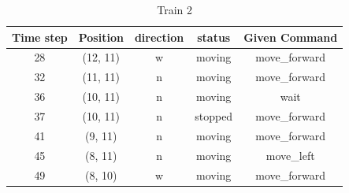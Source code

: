 \begin{table}
\centering
\caption{Train 2}
\label{tab:base2}
\begin{tabular}{c c c c c}
\hline
\textbf{Time step} & \textbf{Position} & \textbf{direction} & \textbf{status} & \textbf{Given Command} \\
\hline
28 & (12, 11) & w & moving & move\_forward \\
32 & (11, 11) & n & moving & move\_forward \\
36 & (10, 11) & n & moving & wait \\
37 & (10, 11) & n & stopped & move\_forward \\
41 & (9, 11) & n & moving & move\_forward \\
45 & (8, 11) & n & moving & move\_left \\
49 & (8, 10) & w & moving & move\_forward \\
\hline
\end{tabular}
\end{table}